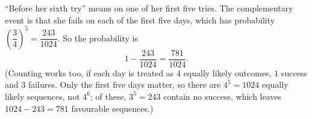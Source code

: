 ``Before her sixth try'' means on one of her first five tries. The complementary event is that she fails on each of the first five days, which has probability $\left(\dfrac34\right)^5=\dfrac{243}{1024}$. So the probability is
\[1-\dfrac{243}{1024}=\boxed{\dfrac{781}{1024}}.\]
(Counting works too, if each day is treated as $4$ equally likely outcomes, $1$ success and $3$ failures. Only the first five days matter, so there are $4^5=1024$ equally likely sequences, not $4^6$; of these, $3^5=243$ contain no success, which leaves $1024-243=781$ favourable sequences.)
